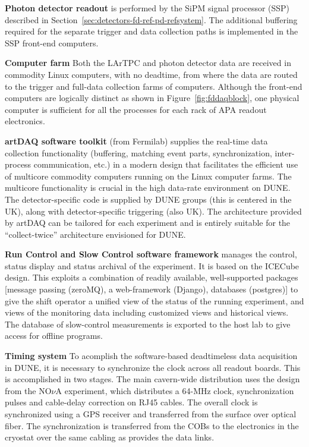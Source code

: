 {\bf Photon detector readout} is performed by the SiPM signal
processor (SSP) described in
Section~\ref{sec:detectors-fd-ref-pd-refsystem}.  The additional
buffering required for the separate trigger and data collection paths
is implemented in the SSP front-end computers.

{\bf Computer farm} Both the LArTPC and photon detector data are
received in commodity Linux computers, with no deadtime, from where
the data are routed to the trigger and full-data collection farms of
computers.  Although the front-end computers are logically distinct as
shown in Figure~\ref{fig:fddaqblock}, one physical computer is
sufficient for all the processes for each rack of APA readout
electronics. 

{\bf artDAQ software toolkit} (from Fermilab) supplies the real-time
data collection functionality (buffering, matching event parts,
synchronization, inter-process communication, etc.) in a modern
design that facilitates the efficient use of multicore commodity
computers running on the Linux computer farms.  The multicore
functionality is crucial in the high data-rate environment on DUNE.  
The detector-specific
code is supplied by DUNE groups (this is centered in the UK), along
with detector-specific triggering (also UK).  The architecture
provided by artDAQ can be tailored for each experiment and is entirely
suitable for the ``collect-twice'' architecture envisioned for DUNE.

{\bf Run Control and Slow Control software framework} manages the
control, status display and status archival of the experiment.  It is
based on the ICECube design.  This
exploits a combination of readily available, well-supported packages
[message passing (zeroMQ), a web-framework (Django), databases (postgres)] 
to give the shift operator a unified view of the status
of the running experiment, and views of the monitoring data including
customized views and historical views.  The database of slow-control
measurements is exported to the host lab to give access for offline
programs.

{\bf Timing system} To acomplish the software-based deadtimeless data
acquisition in DUNE, it is necessary to synchronize the clock across
all readout boards.  This is accomplished in two stages. The main
cavern-wide distribution uses the design from the NO$\nu$A experiment,
which distributes a 64-MHz clock, synchronization pulses and
cable-delay correction on RJ45 cables.  The overall clock is
synchronized using a GPS receiver and transferred from the surface
over optical fiber.  The synchronization is transferred from the COBs
to the electronics in the cryostat over the same cabling as provides
the data links.

